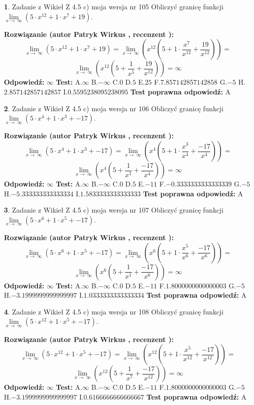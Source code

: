 \documentclass[12pt, a4paper]{article}
\theoremstyle{definition} %
\newtheorem{zad}{}
\newcommand{\zadStart}[1]{\begin{zad}#1\newline}
\newcommand{\zadStop}{\end{zad}}
\newcommand{\rozwStart}[2]{\noindent \textbf{Rozwiązanie (autor #1 , recenzent #2): }\newline}
\newcommand{\rozwStop}{\newline}
\newcommand{\odpStart}{\noindent \textbf{Odpowiedź:}\newline}
\newcommand{\odpStop}{\newline}
\newcommand{\testStart}{\noindent \textbf{Test:}\newline}
\newcommand{\testStop}{\newline}
\newcommand{\kluczStart}{\noindent \textbf{Test poprawna odpowiedź:}\newline}
\newcommand{\kluczStop}{\newline}
\begin{document}
\zadStart{Zadanie z Wikieł Z 4.5 c) moja wersja nr 105}
Obliczyć granicę funkcji  $\lim\limits_{x\to\ \infty}(5 \cdot x^{12}+1 \cdot x^{7}+19)$.
\zadStop
\rozwStart{Patryk Wirkus}{}
$$\lim\limits_{x\to\ \infty}(5 \cdot x^{12}+1 \cdot x^{7}+19) = \lim\limits_{x\to\ \infty}(x^{12}(5 +1 \cdot \frac{x^{7}}{x^{12}}+\frac{19}{x^{12}})) =$$ $$\lim\limits_{x\to\ \infty}(x^{12}(5 +\frac{1}{x^{5}}+\frac{19}{x^{12}})) =\infty$$
\rozwStop
\odpStart
$\infty$
\odpStop
\testStart
A.$\infty$ B.$-\infty$ C.$0$ D.$5$ E.$25$
F.$7.857142857142858$ G.$-5$
H.$2.857142857142857$
I.$0.5595238095238095$
\testStop
\kluczStart
A
\kluczStop



\zadStart{Zadanie z Wikieł Z 4.5 c) moja wersja nr 106}
Obliczyć granicę funkcji  $\lim\limits_{x\to\ \infty}(5 \cdot x^{4}+1 \cdot x^{3}+-17)$.
\zadStop
\rozwStart{Patryk Wirkus}{}
$$\lim\limits_{x\to\ \infty}(5 \cdot x^{4}+1 \cdot x^{3}+-17) = \lim\limits_{x\to\ \infty}(x^{4}(5 +1 \cdot \frac{x^{3}}{x^{4}}+\frac{-17}{x^{4}})) =$$ $$\lim\limits_{x\to\ \infty}(x^{4}(5 +\frac{1}{x^{1}}+\frac{-17}{x^{4}})) =\infty$$
\rozwStop
\odpStart
$\infty$
\odpStop
\testStart
A.$\infty$ B.$-\infty$ C.$0$ D.$5$ E.$-11$
F.$-0.3333333333333339$ G.$-5$
H.$-5.333333333333334$
I.$1.5833333333333333$
\testStop
\kluczStart
A
\kluczStop



\zadStart{Zadanie z Wikieł Z 4.5 c) moja wersja nr 107}
Obliczyć granicę funkcji  $\lim\limits_{x\to\ \infty}(5 \cdot x^{6}+1 \cdot x^{5}+-17)$.
\zadStop
\rozwStart{Patryk Wirkus}{}
$$\lim\limits_{x\to\ \infty}(5 \cdot x^{6}+1 \cdot x^{5}+-17) = \lim\limits_{x\to\ \infty}(x^{6}(5 +1 \cdot \frac{x^{5}}{x^{6}}+\frac{-17}{x^{6}})) =$$ $$\lim\limits_{x\to\ \infty}(x^{6}(5 +\frac{1}{x^{1}}+\frac{-17}{x^{6}})) =\infty$$
\rozwStop
\odpStart
$\infty$
\odpStop
\testStart
A.$\infty$ B.$-\infty$ C.$0$ D.$5$ E.$-11$
F.$1.8000000000000003$ G.$-5$
H.$-3.1999999999999997$
I.$1.0333333333333334$
\testStop
\kluczStart
A
\kluczStop



\zadStart{Zadanie z Wikieł Z 4.5 c) moja wersja nr 108}
Obliczyć granicę funkcji  $\lim\limits_{x\to\ \infty}(5 \cdot x^{12}+1 \cdot x^{5}+-17)$.
\zadStop
\rozwStart{Patryk Wirkus}{}
$$\lim\limits_{x\to\ \infty}(5 \cdot x^{12}+1 \cdot x^{5}+-17) = \lim\limits_{x\to\ \infty}(x^{12}(5 +1 \cdot \frac{x^{5}}{x^{12}}+\frac{-17}{x^{12}})) =$$ $$\lim\limits_{x\to\ \infty}(x^{12}(5 +\frac{1}{x^{7}}+\frac{-17}{x^{12}})) =\infty$$
\rozwStop
\odpStart
$\infty$
\odpStop
\testStart
A.$\infty$ B.$-\infty$ C.$0$ D.$5$ E.$-11$
F.$1.8000000000000003$ G.$-5$
H.$-3.1999999999999997$
I.$0.6166666666666667$
\testStop
\kluczStart
A
\kluczStop
\end{document}
